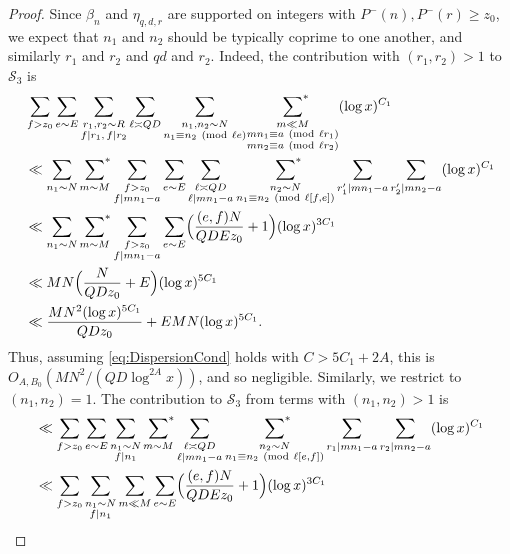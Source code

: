 \documentclass[10pt]{amsart}
\theoremstyle{plain}
\numberwithin{equation}{section}
\newcommand{\Mod}[1]{\ (\mathrm{mod}\ #1)}
\begin{document}
\begin{proof}
Since $\beta_n$ and $\eta_{q,d,r}$ are supported on integers with $P^-(n),P^-(r)\ge z_0$, we expect that $n_1$ and $n_2$ should be typically coprime to one another, and similarly $r_1$ and $r_2$ and $q d$ and $r_2$. Indeed, the contribution with $(r_1,r_2)>1$ to $\mathscr{S}_{3}$ is
\begin{align*}
&\sum_{f>z_0}\sum_{e\sim E}\sum_{\substack{r_1,r_2\sim R\\ f|r_1,\,f|r_2}}\sum_{\ell\asymp Q D}\sum_{\substack{n_1,n_2\sim N\\ n_1\equiv n_2\Mod{\ell e}}}\,\sideset{}{^*}\sum_{\substack{m\ll M\\ m n_1 \equiv a\Mod{\ell r_1}\\ m n_2\equiv a\Mod{\ell r_2} }}(\log{x})^{C_1}\\
&\ll\sum_{\substack{n_1\sim N}}\,\sideset{}{^*}\sum_{m\sim M}\sum_{\substack{f>z_0\\ f|m n_1-a}}\sum_{e\sim E}\sum_{\substack{\ell\asymp Q D\\ \ell|m n_1-a}}\,\,\sideset{}{^*}\sum_{\substack{n_2\sim N\\ n_1\equiv n_2\Mod{\ell [f, e]}}}\sum_{r_1'|m n_1-a}\sum_{r_2'|m n_2-a}(\log{x})^{C_1}\\
&\ll \sum_{n_1\sim N}\,\sideset{}{^*}\sum_{m\sim M}\sum_{\substack{f>z_0\\ f|mn_1-a}}\sum_{e\sim E}\Bigl(\frac{(e,f)N}{Q D E z_0}+1\Bigr)(\log{x})^{3C_1}\\
&\ll MN\Bigl(\frac{N}{Q Dz_0}+E\Bigr)(\log{x})^{5C_1}\\
&\ll \frac{MN^2(\log{x})^{5C_1} }{Q D z_0}+EMN(\log{x})^{5C_1}.
\end{align*}
Thus, assuming \eqref{eq:DispersionCond} holds with $C>5C_1+2A$, this is $O_{A,B_0}(MN^2/(Q D\log^{2A}{x}))$, and so negligible. Similarly, we restrict to $(n_1,n_2)=1$. The contribution to $\mathscr{S}_{3}$ from terms with $(n_1,n_2)>1$ is
\begin{align*}
&\ll \sum_{f>z_0}\sum_{e\sim E}\sum_{\substack{n_1\sim N\\ f|n_1}}\,\sideset{}{^*}\sum_{m\sim  M}\sum_{\substack{\ell\asymp Q D\\ \ell|mn_1-a}}\,\,\sideset{}{^*}\sum_{\substack{n_2\sim N\\ n_1\equiv n_2\Mod{\ell [e,f]}}}\sum_{r_1|m n_1-a}\sum_{r_2|m n_2-a}(\log{x})^{C_1}\\
&\ll \sum_{f>z_0}\sum_{\substack{n_1\sim N\\ f|n_1}}\sum_{m\ll  M}\sum_{e\sim E}\Bigl(\frac{(e,f)N}{Q D E z_0}+1\Bigr)(\log{x})^{3C_1}\\

\end{align*}
\end{proof}
\end{document}
